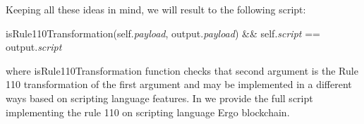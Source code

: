 \documentclass[runningheads]{llncs}
\newcommand{\dnote}[1]{\textcolor{red}{D: {#1}}}
\newcommand{\payload}{\textit{payload}}
\newcommand{\script}{\textit{script}}
\newcommand{\And}{\&\&}
\def\Let#1#2{\State #1 $\gets$ #2}
\begin{document}
    Keeping all these ideas in mind, we will result to the following script:

    \begin{algorithm}[H]
        \caption{Output protecting \script{}}
        \begin{algorithmic}[1]
            \State isRule110Transformation(self.\payload{}, output.\payload{}) \And{}
            \State self.\script{} == output.\script{}
            \vskip8pt
        \end{algorithmic}
    \end{algorithm}

    where isRule110Transformation function checks that second argument is the Rule 110
    transformation of the first argument and may be implemented in a different ways based
    on scripting language features. In  we provide the
    full script implementing the rule 110 on scripting language Ergo blockchain.

%
%
%
%
\end{document}

